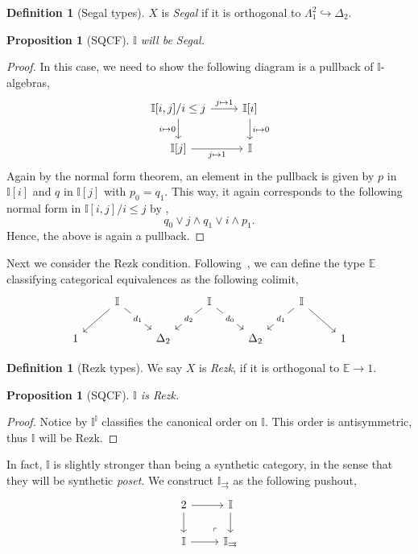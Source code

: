 \documentclass[12pt]{amsart}
\newtheorem{proposition}[theorem]{Proposition}
\theoremstyle{definition}
\newtheorem{definition}[theorem]{Definition}
\newcommand{\mbb}[1]{\mathbb{#1}}
\newcommand{\I}{\mbb I}
\newcommand{\hook}{\hookrightarrow}
\begin{document}
\begin{definition}[Segal types]
  $X$ is \emph{Segal} if it is orthogonal to $\Lambda^2_1 \hook \Delta_2$.
\end{definition}

\begin{proposition}[SQCF]
  $\I$ will be Segal.
\end{proposition}
\begin{proof}
  In this case, we need to show the following diagram is a pullback of $\I$-algebras, 
  \[
  \begin{tikzcd}
    \I[i,j]/i\le j \ar[r, "j \mapsto 1"] \ar[d, "i \mapsto 0"'] & \I[i] \ar[d, "i \mapsto 0"] \\
    \I[j] \ar[r, "j \mapsto 1"'] & \I
  \end{tikzcd}
  \]
  Again by the normal form theorem, an element in the pullback is given by $p$ in $\I[i]$ and $q$ in $\I[j]$ with $p_0 = q_1$. This way, it again corresponds to the following normal form in $\I[i,j]/i \le j$ by ,
  \[ q_0 \vee j \wedge q_1 \vee i \wedge p_1. \]
  Hence, the above is again a pullback.
\end{proof}

Next we consider the Rezk condition. Following~\cite{buchholtz2021synthetic}, we can define the type $\mbb E$ classifying categorical equivalences as the following colimit,
\[
\begin{tikzcd}
	& \I && \I && \I \\
	1 && {\Delta_2} && {\Delta_2} && 1
	\arrow[from=1-2, to=2-1]
	\arrow["{d_1}"{description}, from=1-2, to=2-3]
	\arrow["{d_2}"{description}, from=1-4, to=2-3]
	\arrow["{d_0}"{description}, from=1-4, to=2-5]
	\arrow["{d_1}"{description}, from=1-6, to=2-5]
	\arrow[from=1-6, to=2-7]
\end{tikzcd}
\]

\begin{definition}[Rezk types]
  We say $X$ is \emph{Rezk}, if it is orthogonal to $\mbb E \to 1$.
\end{definition}

\begin{proposition}[SQCF]
  $\I$ is Rezk.
\end{proposition}
\begin{proof}
  Notice by  $\I^\I$ classifies the canonical order on $\I$. This order is antisymmetric, thus $\I$ will be Rezk.
\end{proof}

In fact, $\I$ is slightly stronger than being a synthetic category, in the sense that they will be synthetic \emph{poset}. We construct $\I_{\rightrightarrows}$ as the following pushout,
\[
\begin{tikzcd}
  2 \ar[r] \ar[d] & \I \ar[d] \\ 
  \I \ar[r] & \I_{\rightrightarrows}
  \arrow["\lrcorner"{anchor=center, pos=0.125, rotate=180}, draw=none, from=2-2, to=1-1]
\end{tikzcd}
\]
\end{document}
